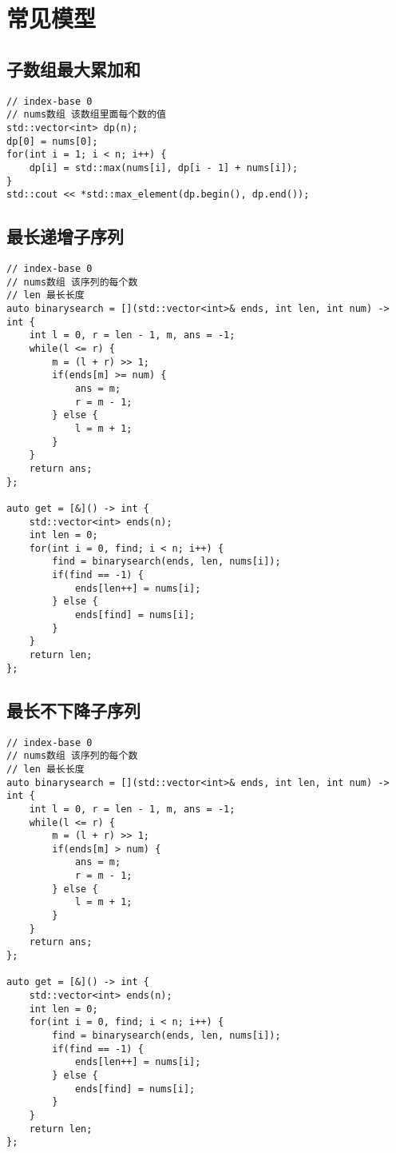 \section{常见模型}

\subsection{子数组最大累加和}
\begin{lstlisting}
// index-base 0
// nums数组 该数组里面每个数的值
std::vector<int> dp(n);
dp[0] = nums[0];
for(int i = 1; i < n; i++) {
    dp[i] = std::max(nums[i], dp[i - 1] + nums[i]);
}
std::cout << *std::max_element(dp.begin(), dp.end());
\end{lstlisting}

\subsection{最长递增子序列}

\begin{lstlisting}
// index-base 0
// nums数组 该序列的每个数
// len 最长长度
auto binarysearch = [](std::vector<int>& ends, int len, int num) -> int {
    int l = 0, r = len - 1, m, ans = -1;
    while(l <= r) {
        m = (l + r) >> 1;
        if(ends[m] >= num) {
            ans = m;
            r = m - 1;
        } else {
            l = m + 1;
        }
    }
    return ans;
};

auto get = [&]() -> int {
    std::vector<int> ends(n);
    int len = 0;
    for(int i = 0, find; i < n; i++) {
        find = binarysearch(ends, len, nums[i]);
        if(find == -1) {
            ends[len++] = nums[i];
        } else {
            ends[find] = nums[i];
        }
    }
    return len;
};
\end{lstlisting}

\subsection{最长不下降子序列}
\begin{lstlisting}
// index-base 0
// nums数组 该序列的每个数
// len 最长长度
auto binarysearch = [](std::vector<int>& ends, int len, int num) -> int {
    int l = 0, r = len - 1, m, ans = -1;
    while(l <= r) {
        m = (l + r) >> 1;
        if(ends[m] > num) {
            ans = m;
            r = m - 1;
        } else {
            l = m + 1;
        }
    }
    return ans;
};

auto get = [&]() -> int {
    std::vector<int> ends(n);
    int len = 0;
    for(int i = 0, find; i < n; i++) {
        find = binarysearch(ends, len, nums[i]);
        if(find == -1) {
            ends[len++] = nums[i];
        } else {
            ends[find] = nums[i];
        }
    }
    return len;
};
\end{lstlisting}

